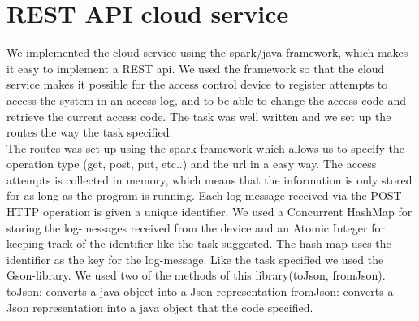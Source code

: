 \section{REST API cloud service}
We implemented the cloud service using the spark/java framework, which makes it easy to implement a REST api.
We used the framework so that the cloud service makes it possible for the access control device to register attempts to access the system in an access log, and to be able to change the access code and retrieve the current access code.
The task was well written and we set up the routes the way the task specified. \\

The routes was set up using the spark framework which allows us to specify the operation type (get, post, put, etc..) and the url in a easy way.
The access attempts is collected in memory, which means that the information is only stored for as long as the program is running. Each log message received via the POST HTTP operation is given a unique identifier. We used a Concurrent HashMap for storing the log-messages received from the device and an Atomic Integer for keeping track of the identifier like the task suggested. The hash-map uses the identifier as the key for the log-message.
Like the task specified we used the Gson-library. We used two of the methods of this library(toJson, fromJson).
toJson: converts a java object into a Json representation
fromJson: converts a Json representation into a java object that the code specified.
